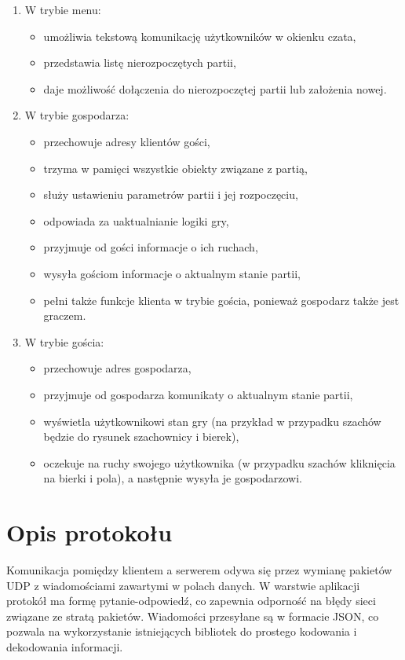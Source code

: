 \documentclass[a4paper, 12pt]{article}
\begin{document}
\begin{enumerate}
 \item W trybie menu:
    \begin{itemize}
      \item umożliwia tekstową komunikację użytkowników w okienku czata,
      \item przedstawia listę nierozpoczętych partii,
      \item daje możliwość dołączenia do nierozpoczętej partii lub założenia nowej.
    \end{itemize}

 \item W trybie gospodarza:
    \begin{itemize}
      \item przechowuje adresy klientów gości,
      \item trzyma w pamięci wszystkie obiekty związane z partią, 
      \item służy ustawieniu parametrów partii i jej rozpoczęciu,
      \item odpowiada za uaktualnianie logiki gry,
      \item przyjmuje od gości informacje o ich ruchach,
      \item wysyła gościom informacje o aktualnym stanie partii,
      \item pełni także funkcje klienta w trybie gościa, ponieważ gospodarz także jest graczem.
    \end{itemize}

 \item W trybie gościa:
    \begin{itemize}
      \item przechowuje adres gospodarza,
      \item przyjmuje od gospodarza komunikaty o aktualnym stanie partii,
      \item wyświetla użytkownikowi stan gry (na przykład w przypadku szachów będzie do rysunek szachownicy i bierek),
      \item oczekuje na ruchy swojego użytkownika (w przypadku szachów kliknięcia na bierki i pola), a następnie wysyła je gospodarzowi.
    \end{itemize}
\end{enumerate}


\section{Opis protokołu}
Komunikacja pomiędzy klientem a serwerem odywa się przez wymianę pakietów UDP z wiadomościami zawartymi w polach danych. W warstwie aplikacji protokół ma formę pytanie-odpowiedź, co zapewnia odporność na błędy sieci związane ze stratą pakietów. Wiadomości przesyłane są w formacie JSON, co pozwala na wykorzystanie istniejących bibliotek do prostego kodowania i dekodowania informacji.
\end{document}
